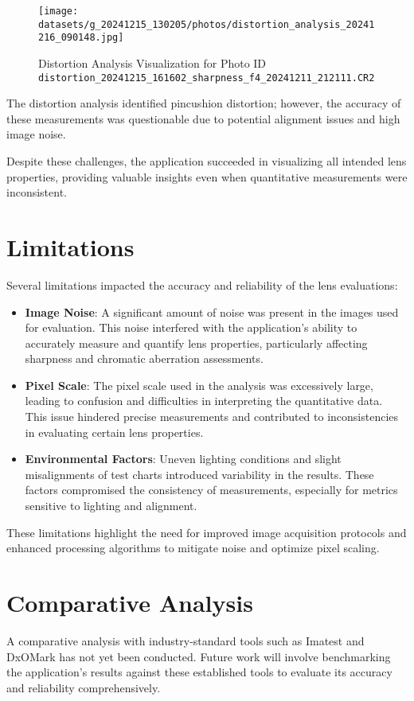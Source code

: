 \begin{figure}[H]
    \centering
    \texttt{[image: datasets/g\_20241215\_130205/photos/distortion\_analysis\_20241216\_090148.jpg]}
    \caption{Distortion Analysis Visualization for Photo ID \texttt{distortion\_20241215\_161602\_sharpness\_f4\_20241211\_212111.CR2}}
    \label{fig:distortion_visualization}
\end{figure}

The distortion analysis identified pincushion distortion; however, the accuracy of these measurements was questionable due to potential alignment issues and high image noise.

Despite these challenges, the application succeeded in visualizing all intended lens properties, providing valuable insights even when quantitative measurements were inconsistent.

\section{Limitations}
Several limitations impacted the accuracy and reliability of the lens evaluations:

\begin{itemize}
    \item \textbf{Image Noise}: A significant amount of noise was present in the images used for evaluation. This noise interfered with the application's ability to accurately measure and quantify lens properties, particularly affecting sharpness and chromatic aberration assessments.
    \item \textbf{Pixel Scale}: The pixel scale used in the analysis was excessively large, leading to confusion and difficulties in interpreting the quantitative data. This issue hindered precise measurements and contributed to inconsistencies in evaluating certain lens properties.
    \item \textbf{Environmental Factors}: Uneven lighting conditions and slight misalignments of test charts introduced variability in the results. These factors compromised the consistency of measurements, especially for metrics sensitive to lighting and alignment.
\end{itemize}

These limitations highlight the need for improved image acquisition protocols and enhanced processing algorithms to mitigate noise and optimize pixel scaling.

\section{Comparative Analysis}
A comparative analysis with industry-standard tools such as Imatest and DxOMark has not yet been conducted. Future work will involve benchmarking the application's results against these established tools to evaluate its accuracy and reliability comprehensively.

